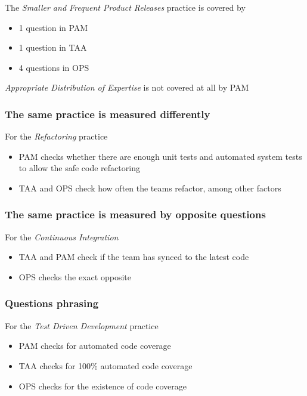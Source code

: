 The \textit{Smaller and Frequent Product Releases} practice is covered by

\begin{itemize}
	\item 1 question in PAM
	\item 1 question in TAA
	\item 4 questions in OPS
\end{itemize}

\textit{Appropriate Distribution of Expertise} is not covered at all by PAM

\clearpage

\subsubsection{The same practice is measured differently}

For the \textit{Refactoring} practice 

\begin{itemize}
	\item PAM checks whether there are enough unit tests and automated system tests to allow the safe code refactoring
	\item TAA and OPS check how often the teams refactor, among other factors
\end{itemize}

\clearpage

\subsubsection{The same practice is measured by opposite questions}

For the \textit{Continuous Integration}

\begin{itemize}
	\item TAA and PAM check if the team has synced to the latest code
	\item OPS checks the exact opposite
\end{itemize}

\clearpage

\subsubsection{Questions phrasing}

For the \textit{Test Driven Development} practice

\begin{itemize}
	\item PAM checks for automated code coverage
	\item TAA checks for 100\% automated code coverage
	\item OPS checks for the existence of code coverage
\end{itemize}


